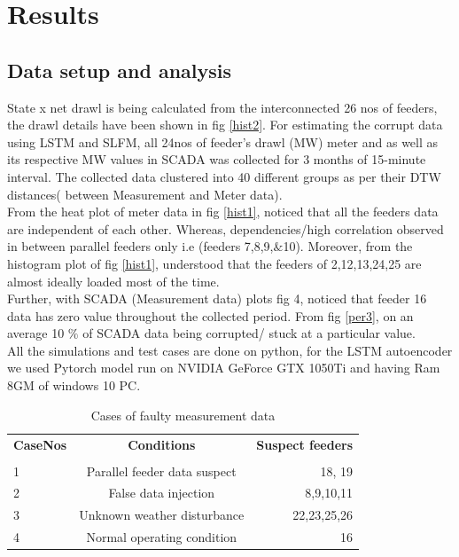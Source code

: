 \documentclass[conference]{IEEEtran}
\begin{document}
\section{Results}
\subsection{Data setup and analysis}
State x net drawl is being calculated from the interconnected 26 nos of feeders, the drawl details have been shown in fig \ref{hist2}. For estimating the corrupt data using LSTM and SLFM, all 24nos of feeder's drawl (MW) meter and as well as its respective MW values in SCADA was collected for 3 months of 15-minute interval. The collected data clustered into 40 different groups as per their DTW distances( between Measurement and Meter data).\\

From the heat plot of meter data in fig \ref{hist1}, noticed that all the feeders data are independent of each other. Whereas, dependencies/high correlation observed in between parallel feeders only i.e (feeders 7,8,9,$\&$10). Moreover, from the histogram plot of fig \ref{hist1}, understood that the feeders of 2,12,13,24,25 are almost ideally loaded most of the time.\\

Further, with SCADA (Measurement data) plots fig 4, noticed that feeder 16 data has zero value throughout the collected period. From fig \ref{per3}, on an average 10 $\%$ of SCADA data being corrupted/ stuck at a particular value.\\

All the simulations and test cases are done on python, for the LSTM autoencoder we used Pytorch model run on NVIDIA GeForce GTX 1050Ti and having Ram 8GM of windows 10 PC.\\

\begin{table}[h!]
  \begin{center}
    \caption{Cases of faulty measurement data } 

    \label{tab:table2}
      
       \begin{tabular}{l|c|r} %
      \textbf{CaseNos} & \textbf{Conditions} & \textbf{Suspect feeders}\\ \\
      \hline
      1 & Parallel feeder data suspect & 18, 19\\
      2 & False data injection  & 8,9,10,11\\
      3 & Unknown weather disturbance & 22,23,25,26\\
      4 & Normal operating condition & 16\\
    \end{tabular}
  \end{center}
\end{table}
\end{document}
